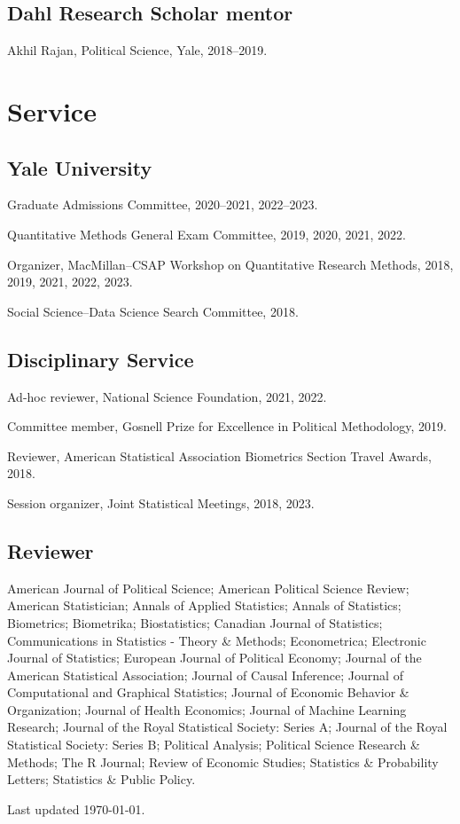\documentclass[10pt,letterpaper]{article}
\newenvironment{infolist}{
	\begin{list}{}{
		\setlength{\parskip}{0pt}
		\setlength{\itemsep}{4pt}
		\setlength{\parsep}{0.3em}
		\setlength{\leftmargin}{0em}
		\setlength{\labelwidth}{0em}
		}
	}{
\end{list}
}
\newcommand{\infoitem}[1]{\item {#1}}
\begin{document}
	\subsection*{Dahl Research Scholar mentor}

	\begin{infolist}
		\infoitem{Akhil Rajan, Political Science, Yale, 2018--2019.}
	\end{infolist}


	\section*{Service}

	\subsection*{Yale University}

	\begin{infolist}
		\infoitem{Graduate Admissions Committee, 2020--2021, 2022--2023.}
		\infoitem{Quantitative Methods General Exam Committee, 2019, 2020, 2021, 2022.}
		\infoitem{Organizer, MacMillan--CSAP Workshop on Quantitative Research Methods, 2018, 2019, 2021, 2022, 2023.}
		\infoitem{Social Science--Data Science Search Committee, 2018.}
	\end{infolist}

	\subsection*{Disciplinary Service}

	\begin{infolist}
		\infoitem{Ad-hoc reviewer, National Science Foundation, 2021, 2022.}
		\infoitem{Committee member, Gosnell Prize for Excellence in Political Methodology, 2019.}
		\infoitem{Reviewer, American Statistical Association Biometrics Section Travel Awards, 2018.}
		\infoitem{Session organizer, Joint Statistical Meetings, 2018, 2023.}
	\end{infolist}

	\subsection*{Reviewer}

	\begin{infolist}
		\infoitem{American Journal of Political Science; American Political Science Review; American Statistician; Annals of Applied Statistics; Annals of Statistics; Biometrics; Biometrika; Biostatistics; Canadian Journal of Statistics; Communications in Statistics - Theory \& Methods; Econometrica; Electronic Journal of Statistics; European Journal of Political Economy; Journal of the American Statistical Association; Journal of Causal Inference; Journal of Computational and Graphical Statistics; Journal of Economic Behavior \& Organization; Journal of Health Economics; Journal of Machine Learning Research; Journal of the Royal Statistical Society: Series A; Journal of the Royal Statistical Society: Series B; Political Analysis; Political Science Research \& Methods; The R Journal; Review of Economic Studies; Statistics \& Probability Letters; Statistics \& Public Policy.}
	\end{infolist}

	\bigskip
	{\small Last updated \today.}
\end{document}
